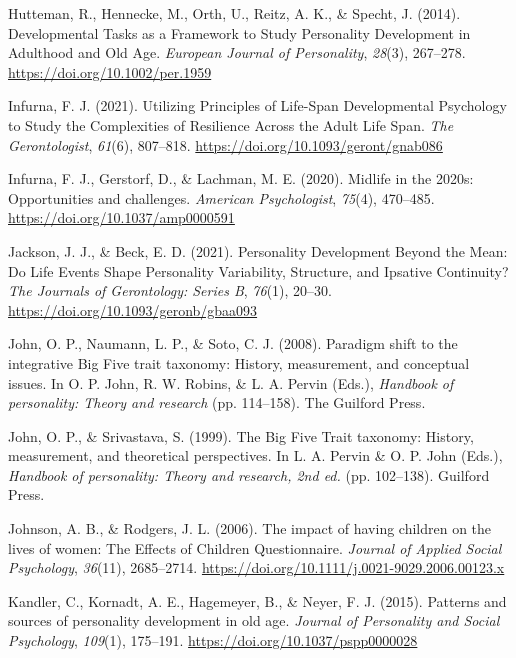 \documentclass[
  english,
  man,floatsintext]{apa7}
\begin{document}
\leavevmode\hypertarget{ref-huttemanDevelopmentalTasksFramework2014}{}%
Hutteman, R., Hennecke, M., Orth, U., Reitz, A. K., \& Specht, J. (2014). Developmental Tasks as a Framework to Study Personality Development in Adulthood and Old Age. \emph{European Journal of Personality}, \emph{28}(3), 267--278. \url{https://doi.org/10.1002/per.1959}

\leavevmode\hypertarget{ref-infurnaUtilizingPrinciplesLifeSpan2021}{}%
Infurna, F. J. (2021). Utilizing Principles of Life-Span Developmental Psychology to Study the Complexities of Resilience Across the Adult Life Span. \emph{The Gerontologist}, \emph{61}(6), 807--818. \url{https://doi.org/10.1093/geront/gnab086}

\leavevmode\hypertarget{ref-infurnaMidlife2020sOpportunities2020}{}%
Infurna, F. J., Gerstorf, D., \& Lachman, M. E. (2020). Midlife in the 2020s: Opportunities and challenges. \emph{American Psychologist}, \emph{75}(4), 470--485. \url{https://doi.org/10.1037/amp0000591}

\leavevmode\hypertarget{ref-jacksonPersonalityDevelopmentMean2021}{}%
Jackson, J. J., \& Beck, E. D. (2021). Personality Development Beyond the Mean: Do Life Events Shape Personality Variability, Structure, and Ipsative Continuity? \emph{The Journals of Gerontology: Series B}, \emph{76}(1), 20--30. \url{https://doi.org/10.1093/geronb/gbaa093}

\leavevmode\hypertarget{ref-johnParadigmShiftIntegrative2008}{}%
John, O. P., Naumann, L. P., \& Soto, C. J. (2008). Paradigm shift to the integrative Big Five trait taxonomy: History, measurement, and conceptual issues. In O. P. John, R. W. Robins, \& L. A. Pervin (Eds.), \emph{Handbook of personality: Theory and research} (pp. 114--158). The Guilford Press.

\leavevmode\hypertarget{ref-johnBigFiveTrait1999}{}%
John, O. P., \& Srivastava, S. (1999). The Big Five Trait taxonomy: History, measurement, and theoretical perspectives. In L. A. Pervin \& O. P. John (Eds.), \emph{Handbook of personality: Theory and research, 2nd ed.} (pp. 102--138). Guilford Press.

\leavevmode\hypertarget{ref-johnsonImpactHavingChildren2006}{}%
Johnson, A. B., \& Rodgers, J. L. (2006). The impact of having children on the lives of women: The Effects of Children Questionnaire. \emph{Journal of Applied Social Psychology}, \emph{36}(11), 2685--2714. \url{https://doi.org/10.1111/j.0021-9029.2006.00123.x}

\leavevmode\hypertarget{ref-kandlerPatternsSourcesPersonality2015a}{}%
Kandler, C., Kornadt, A. E., Hagemeyer, B., \& Neyer, F. J. (2015). Patterns and sources of personality development in old age. \emph{Journal of Personality and Social Psychology}, \emph{109}(1), 175--191. \url{https://doi.org/10.1037/pspp0000028}
\end{document}
